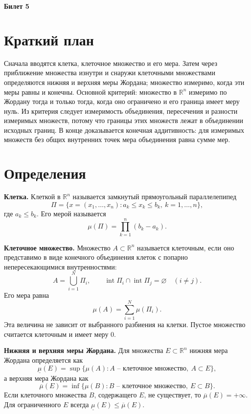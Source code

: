 \documentclass[12pt,a4paper]{article}
\newcommand{\R}{\mathbb{R}}
\newcommand{\Int}{\operatorname{int}}
\newcommand{\lowmu}{\underline{\mu}}
\newcommand{\upmu}{\overline{\mu}}
\begin{document}
\begin{center}
{\Large\bfseries Билет 5}
\end{center}

\noindent{}

\section*{Краткий план}

Сначала вводятся клетка, клеточное множество и его мера. Затем через
приближение множества изнутри и снаружи клеточными множествами определяются
нижняя и верхняя меры Жордана; множество измеримо, когда эти меры равны и
конечны. Основной критерий: множество в \(\R^n\) измеримо по Жордану тогда и
только тогда, когда оно ограничено и его граница имеет меру нуль. Из критерия
следует измеримость объединения, пересечения и разности измеримых множеств,
потому что границы этих множеств лежат в объединении исходных границ. В конце
доказывается конечная аддитивность: для измеримых множеств без общих
внутренних точек мера объединения равна сумме мер.

\section*{Определения}

\textbf{Клетка.}
Клеткой в \(\R^n\) называется замкнутый прямоугольный параллелепипед
\[
  \Pi=
  \{x=(x_1,\dots,x_n): a_k\le x_k\le b_k,\ k=1,\dots,n\},
\]
где \(a_k\le b_k\). Его мерой называется
\[
  \mu(\Pi)=\prod_{k=1}^n(b_k-a_k).
\]

\textbf{Клеточное множество.}
Множество \(A\subset\R^n\) называется клеточным, если оно представимо в виде
конечного объединения клеток с попарно непересекающимися внутренностями:
\[
  A=\bigcup_{i=1}^N \Pi_i,\qquad
  \Int\Pi_i\cap\Int\Pi_j=\varnothing\quad(i\ne j).
\]
Его мера равна
\[
  \mu(A)=\sum_{i=1}^N\mu(\Pi_i).
\]
Эта величина не зависит от выбранного разбиения на клетки. Пустое множество
считается клеточным и имеет меру \(0\).

\textbf{Нижняя и верхняя меры Жордана.}
Для множества \(E\subset\R^n\) нижняя мера Жордана определяется как
\[
  \lowmu(E)=
  \sup\{\mu(A): A\text{ -- клеточное множество},\ A\subset E\},
\]
а верхняя мера Жордана как
\[
  \upmu(E)=
  \inf\{\mu(B): B\text{ -- клеточное множество},\ E\subset B\}.
\]
Если клеточного множества \(B\), содержащего \(E\), не существует, то
\(\upmu(E)=+\infty\). Для ограниченного \(E\) всегда
\(\lowmu(E)\le\upmu(E)\).
\end{document}
